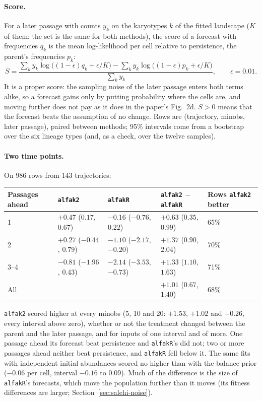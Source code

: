 \documentclass[11pt]{article}
\begin{document}
\paragraph{Score.} For a later passage with counts $y_k$ on the karyotypes $k$
of the fitted landscape ($K$ of them; the set is the same for both methods),
the score of a forecast with frequencies $q_k$ is the mean log-likelihood per
cell relative to persistence, the parent's frequencies $p_k$:
\begin{equation}
  S=\frac{\sum_k y_k\log\bigl((1-\epsilon)q_k+\epsilon/K\bigr)
         -\sum_k y_k\log\bigl((1-\epsilon)p_k+\epsilon/K\bigr)}{\sum_k y_k},
  \qquad \epsilon=0.01.
  \label{eq:horizon-score}
\end{equation}
It is a proper score: the sampling noise of the later passage enters both
terms alike, so a forecast gains only by putting probability where the cells
are, and moving further does not pay as it does in the paper's Fig.~2d.
$S>0$ means that the forecast beats the assumption of no change. Rows are
(trajectory, minobs, later passage), paired between methods; 95\% intervals
come from a bootstrap over the six lineage types (and, as a check, over the
twelve samples).

\paragraph{Two time points.} On 986 rows from 143 trajectories:

\begin{center}
\begin{tabular}{L{0.16\textwidth}L{0.17\textwidth}L{0.17\textwidth}L{0.2\textwidth}L{0.13\textwidth}}
\toprule
Passages ahead & \texttt{alfak2} & \texttt{alfakR} & \texttt{alfak2} $-$ \texttt{alfakR} & Rows \texttt{alfak2} better \\
 & $+0.47$ ($0.17$, $0.67$) & $-0.16$ ($-0.76$, $0.22$) & $+0.63$ ($0.35$, $0.99$) & 65\% \\
2 & $+0.27$ ($-0.44$, $0.79$) & $-1.10$ ($-2.17$, $-0.20$) & $+1.37$ ($0.90$, $2.04$) & 70\% \\
3--4 & $-0.81$ ($-1.96$, $0.43$) & $-2.14$ ($-3.53$, $-0.73$) & $+1.33$ ($1.10$, $1.63$) & 71\% \\
All & & & $+1.01$ ($0.67$, $1.40$) & 68\% \\
\bottomrule
\end{tabular}
\end{center}

\texttt{alfak2} scored higher at every minobs (5, 10 and 20: $+1.53$, $+1.02$
and $+0.26$, every interval above zero), whether or not the treatment changed
between the parent and the later passage, and for inputs of one interval and
of more. One passage ahead its forecast beat persistence and
\texttt{alfakR}'s did not; two or more passages ahead neither beat
persistence, and \texttt{alfakR} fell below it. The same fits with
independent initial abundances scored no higher than with the balance prior
($-0.06$ per cell, interval $-0.16$ to $0.09$). Much of the difference is the
size of \texttt{alfakR}'s forecasts, which move the population further than
it moves (its fitness differences are larger;
Section~\ref{sec:salehi-noise}).
\end{document}
